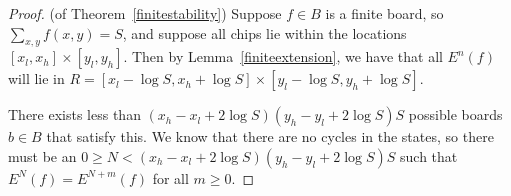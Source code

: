 \documentclass[11pt]{article}
\begin{document}
\begin{proof}
(of Theorem~\ref{finitestability}) Suppose $f \in B$ is a finite board, so $\sum_{x,y} f(x,y) = S$, and suppose all chips lie within the locations $[x_l, x_h] \times [y_l, y_h]$. Then by Lemma~\ref{finiteextension}, we have that all $E^n(f)$ will lie in $R = [x_l - \log S, x_h + \log S] \times [y_l - \log S, y_h + \log S]$. 

There exists less than $(x_h - x_l + 2\log S)(y_h - y_l + 2\log S)S$ possible boards $b \in B$ that satisfy this. We know that there are no cycles in the states, so there must be an $0 \geq N < (x_h - x_l + 2\log S)(y_h - y_l + 2\log S)S$ such that $E^N(f) = E^{N+m}(f)$ for all $m \geq 0$.
\end{proof}
\end{document}
